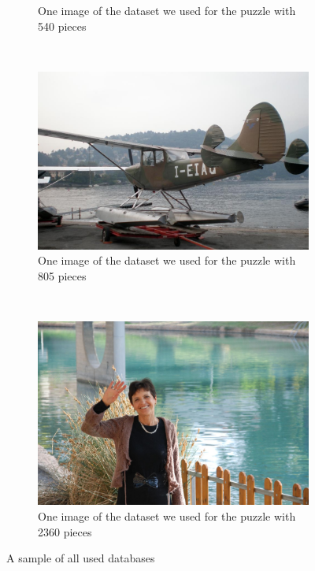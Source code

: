 \documentclass[11pt]{report}
\begin{document}
\begin{figure}
\begin{subfigure}[b]{0.45\textwidth}
		\caption{One image of the dataset we used for the puzzle with 540  pieces}
		\label{img:540}
	\end{subfigure}
	~
	\begin{subfigure}[b]{0.45\textwidth}
		\includegraphics[width=\textwidth]{../imData/805/1.jpg}
		\caption{One image of the dataset we used for the puzzle with 805 pieces}
		\label{img:805}
	\end{subfigure}
	~
	\begin{subfigure}[b]{0.45\textwidth}
		\includegraphics[width=\textwidth]{../imData/2360/1.jpg}
		\caption{One image of the dataset we used for the puzzle with 2360 pieces}
		\label{img:2360}
	\end{subfigure}

	\caption{A sample of all used databases}
	\label{fig:database}
\end{figure}
\end{document}
